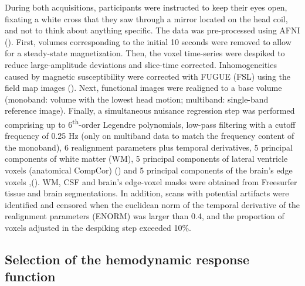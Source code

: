During both acquisitions, participants were instructed to keep their eyes open, fixating a white cross that they saw through a mirror located on the head coil, and not to think about anything specific. The data was pre-processed using AFNI (\citealt{Cox1996AFNISoftwareAnalysis}). First, volumes corresponding to the initial 10 seconds were removed to allow for a steady-state magnetization. Then, the voxel time-series were despiked to reduce large-amplitude deviations and slice-time corrected. Inhomogeneities caused by magnetic susceptibility were corrected with FUGUE (FSL) using the field map images (\citealt{Jenkinson2012FSL}). Next, functional images were realigned to a base volume (monoband: volume with the lowest head motion; multiband: single-band reference image). Finally, a simultaneous nuisance regression step was performed comprising up to 6\textsuperscript{th}-order Legendre polynomials, low-pass filtering with a cutoff frequency of 0.25 Hz (only on multiband data to match the frequency content of the monoband), 6 realignment parameters plus temporal derivatives, 5 principal components of white matter (WM), 5 principal components of lateral ventricle voxels (anatomical CompCor) (\citealt{Behzadi_2007}) and 5 principal components of the brain's edge voxels ,(\citealt{Patriat_2015}). WM, CSF and brain's edge-voxel masks were obtained from Freesurfer tissue and brain segmentations. In addition, scans with potential artifacts were identified and censored when the euclidean norm of the temporal derivative of the realignment parameters (ENORM) was larger than 0.4, and the proportion of voxels adjusted in the despiking step exceeded 10\%.

\subsection{Selection of the hemodynamic response function}

